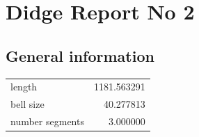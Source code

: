 \documentclass{article}
\begin{document}
\begin{centering}
\begin{figure}[!htb]
\end{figure}
\end{centering}
\section{Didge Report No 2}

\subsection{General information}
\begin{centering}

\begin{figure}[!htb]
\end{figure}
\begin{tabular}{lr}
\toprule
         length & 1181.563291 \\
      bell size &   40.277813 \\
number segments &    3.000000 \\
\bottomrule
\end{tabular}
\end{centering}
\end{document}
